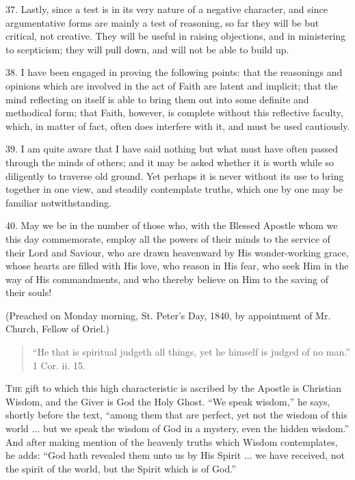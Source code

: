 37. Lastly, since a test is in its very nature of a negative
character, and since argumentative forms are mainly a test of
reasoning, so far they will be but critical, not creative. They will
be useful in raising objections, and in ministering to scepticism;
they will pull down, and will not be able to build up.

38. I have been engaged in proving the following points: that the
reasonings and opinions which are involved in the act of Faith are
latent and implicit; that the mind reflecting on itself is able to
bring them out into some definite and methodical form; that Faith,
however, is complete without this reflective faculty, which, in matter
of fact, often does interfere with it, and must be used cautiously.

39. I am quite aware that I have said nothing but what must have
often passed through the minds of others; and it may be asked whether
it is worth while so diligently to traverse old ground. Yet perhaps it
is never without its use to bring together in one view, and steadily
contemplate truths, which one by one may be familiar notwithstanding.

40. May we be in the number of those who, with the Blessed Apostle
whom we this day commemorate, employ all the powers of their minds to
the service of their Lord and Saviour, who are drawn heavenward by His
wonder-working grace, whose hearts are filled with His love, who
reason in His fear, who seek Him in the way of His commandments, and
who thereby believe on Him to the saving of their souls!

(Preached on Monday morning, St. Peter's Day, 1840, by appointment
of Mr. Church, Fellow of Oriel.)


\begin{quote}

``He that is spiritual judgeth all things, yet he himself is
judged of no man.'' 1 Cor. ii. 15.

\end{quote}

T\textsc{he} gift to which this high characteristic is ascribed by the
Apostle is Christian Wisdom, and the Giver is God the Holy Ghost.
``We speak wisdom,'' he says, shortly before the text,
``among them that are perfect, yet not the wisdom of this world
... but we speak the wisdom of God in a mystery, even the hidden
wisdom.'' And after making mention of the heavenly truths which
Wisdom contemplates, he adds: ``God hath revealed them unto us by
His Spirit ... we have received, not the spirit of the world, but the
Spirit which is of God.''

